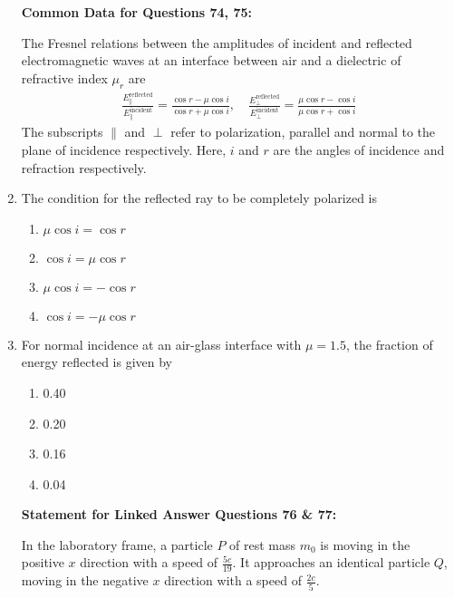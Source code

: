 \documentclass[journal,12pt,onecolumn]{IEEEtran}
\theoremstyle{remark}
\begin{document}
\begin{enumerate}
\textbf{Common Data for Questions 74, 75:}

The Fresnel relations between the amplitudes of incident and reflected electromagnetic waves at an interface between air and a dielectric of refractive index $\mu_r$ are
\begin{align*}
    \frac{E_{\parallel}^{\text{reflected}}}{E_{\parallel}^{\text{incident}}} = \frac{\cos r - \mu \cos i}{\cos r + \mu \cos i}, \quad \frac{E_{\perp}^{\text{reflected}}}{E_{\perp}^{\text{incident}}} = \frac{\mu \cos r - \cos i}{\mu \cos r + \cos i}
\end{align*}
The subscripts $\parallel$ and $\perp$ refer to polarization, parallel and normal to the plane of incidence respectively. Here, $i$ and $r$ are the angles of incidence and refraction respectively.


    \item  The condition for the reflected ray to be completely polarized is
    \begin{multicols}{2}
    \begin{enumerate}
        \item $\mu \cos i = \cos r$
        \item $\cos i = \mu \cos r$
        \item $\mu \cos i = - \cos r$
        \item $\cos i = - \mu \cos r$
    \end{enumerate}
    \end{multicols}

    \item  For normal incidence at an air-glass interface with $\mu = 1.5$, the fraction of energy reflected is given by
    \begin{multicols}{4}
    \begin{enumerate}
        \item 0.40
        \item 0.20
        \item 0.16
        \item 0.04
    \end{enumerate}
    \end{multicols}



\textbf{Statement for Linked Answer Questions 76 \& 77:}

In the laboratory frame, a particle $P$ of rest mass $m_0$ is moving in the positive $x$ direction with a speed of $\frac{5c}{19}$. It approaches an identical particle $Q$, moving in the negative $x$ direction with a speed of $\frac{2c}{5}$.



\end{enumerate}
\end{document}
